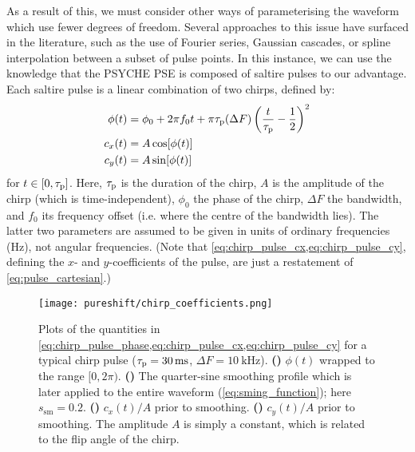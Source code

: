 As a result of this, we must consider other ways of parameterising the waveform which use fewer degrees of freedom.
Several approaches to this issue have surfaced in the literature, such as the use of Fourier series\autocite{Geen1989JMR,Geen1991JMR,Nuzillard1994JMRSA,Kupce1995JMRSA,Kupce1995JMRSB}, Gaussian cascades\autocite{Emsley1990CPL}, or spline interpolation between a subset of pulse points\autocite{Ewing1990CP}.
In this instance, we can use the knowledge that the PSYCHE PSE is composed of saltire pulses to our advantage.
Each saltire pulse is a linear combination of two chirps, defined by:
\begin{align}
    \phi(t) &= \phi_0 + 2\pi f_0 t + \pi\tau_\mathrm{p}(\Delta F)\left(\frac{t}{\tau_\mathrm{p}} - \frac{1}{2}\right)^2 \label{eq:chirp_pulse_phase} \\
    c_x(t) &= A \cos[\phi(t)] \label{eq:chirp_pulse_cx} \\
    c_y(t) &= A \sin[\phi(t)] \label{eq:chirp_pulse_cy}
\end{align}
for $t \in [0, \tau_\mathrm{p}]$. Here, $\tau_\mathrm{p}$ is the duration of the chirp, $A$ is the amplitude of the chirp (which is time-independent), $\phi_0$ the phase of the chirp, $\Delta F$ the bandwidth, and $f_0$ its frequency offset (i.e. where the centre of the bandwidth lies).
The latter two parameters are assumed to be given in units of ordinary frequencies (Hz), not angular frequencies.
(Note that \cref{eq:chirp_pulse_cx,eq:chirp_pulse_cy}, defining the $x$- and $y$-coefficients of the pulse, are just a restatement of \cref{eq:pulse_cartesian}.)

\begin{figure}[htb]
    \centering
    \texttt{[image: pureshift/chirp\_coefficients.png]}%
    {\label{fig:chirp_coefficients_phase}}%
    {\label{fig:chirp_coefficients_smoothing}}%
    {\label{fig:chirp_coefficients_cx}}%
    {\label{fig:chirp_coefficients_cy}}%
    \caption[Phase and Cartesian amplitudes of a typical chirp pulse]{
        Plots of the quantities in \cref{eq:chirp_pulse_phase,eq:chirp_pulse_cx,eq:chirp_pulse_cy} for a typical chirp pulse ($\taup = \qty{30}{\ms}$, $\Delta F = \qty{10}{\kHz}$).
        \textbf{()} $\phi(t)$ wrapped to the range $[0, 2\pi)$.
        \textbf{()} The quarter-sine smoothing profile which is later applied to the entire waveform (\cref{eq:sming_function}); here $s_\text{sm} = 0.2$.
        \textbf{()} $c_x(t)/A$ prior to smoothing.
        \textbf{()} $c_y(t)/A$ prior to smoothing.
        The amplitude $A$ is simply a constant, which is related to the flip angle of the chirp.\autocite{Foroozandeh2018CEJ}
    }
    \label{fig:chirp_coefficients}
\end{figure}

